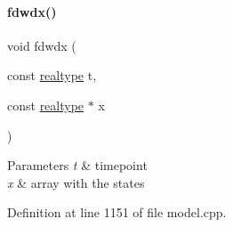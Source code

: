 \paragraph{\texorpdfstring{fdwdx()}{fdwdx()}\hspace{0.1cm}{\footnotesize\ttfamily [1/2]}}
{\footnotesize\ttfamily void fdwdx (\begin{DoxyParamCaption}\item[{const \mbox{\hyperlink{namespaceamici_a1bdce28051d6a53868f7ccbf5f2c14a3}{realtype}}}]{t,  }\item[{const \mbox{\hyperlink{namespaceamici_a1bdce28051d6a53868f7ccbf5f2c14a3}{realtype}} $\ast$}]{x }\end{DoxyParamCaption})}


\begin{DoxyParams}{Parameters}
{\em t} & timepoint \\
\hline
{\em x} & array with the states \\
\hline
\end{DoxyParams}


Definition at line 1151 of file model.\+cpp.

